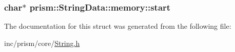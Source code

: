 \subsubsection[{\texorpdfstring{start}{start}}]{\setlength{\rightskip}{0pt plus 5cm}char$\ast$ prism\+::\+String\+Data\+::memory\+::start}\hypertarget{structprism_1_1_string_data_1_1memory_acb8564230189b60e891a5f86de755507}{}\label{structprism_1_1_string_data_1_1memory_acb8564230189b60e891a5f86de755507}


The documentation for this struct was generated from the following file\+:\begin{DoxyCompactItemize}
\item 
inc/prism/core/\hyperlink{_string_8h}{String.\+h}\end{DoxyCompactItemize}
